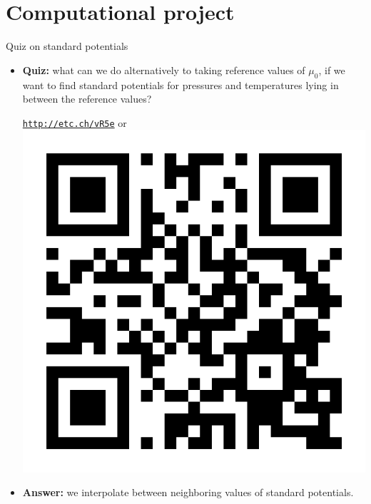 
\section{Computational project}
%
\begin{frame}{Quiz on standard potentials}
	
	\begin{itemize}
		\item \alert{\textbf{Quiz:}} what can we do alternatively to taking reference values of $\mu_0$, if we want to find standard potentials for pressures and temperatures lying in between the reference values?
		\begin{center}
			\href{http://etc.ch/vR5e}{\textcolor{indigo(dye)}{\tt http://etc.ch/vR5e}} \quad or \quad 
			\includegraphics[height=0.2\columnwidth]{figures/computational-projects/polls.png}
		\end{center}
		\hiddenpause
		\vskip 10pt
		\item {\textbf{Answer:}} we interpolate between neighboring values of standard potentials.   
		
	\end{itemize}
\end{frame}
%
